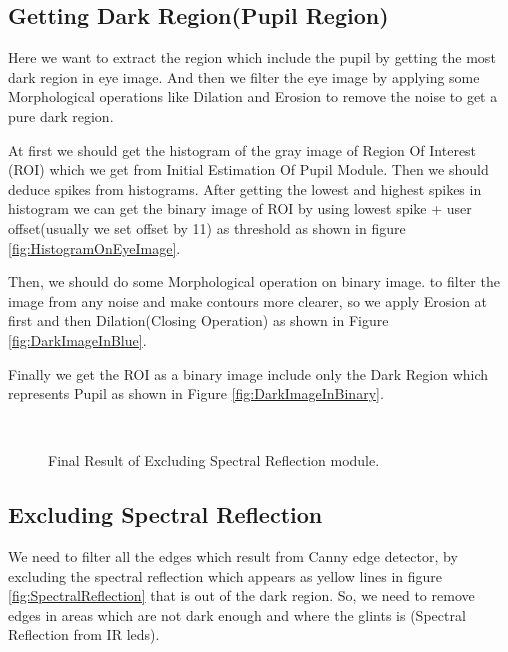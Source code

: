 \documentclass[12pt,fleqn]{book} %
\begin{document}
\subsection{Getting Dark Region(Pupil Region)} 
Here we want to extract the region which include the pupil by getting the most dark region in eye image. And then we filter the eye image by applying some Morphological operations like Dilation and Erosion to remove the noise to get a pure dark region. \bigskip

At first we should get the histogram of the gray image of Region Of Interest (ROI) which we get from Initial Estimation Of Pupil Module. Then we should deduce spikes from histograms. After getting the lowest and highest spikes in histogram we can get the binary image of ROI by using lowest spike +  user offset(usually we set offset by 11) as threshold as shown in figure \ref{fig:HistogramOnEyeImage}. \bigskip

Then, we should do some Morphological operation on binary image. to filter the image from any noise and make contours more clearer, so we apply Erosion at first and then Dilation(Closing Operation) as shown in Figure \ref{fig:DarkImageInBlue}. \bigskip

Finally we get the ROI as a binary image include only the Dark Region which represents Pupil as shown in Figure \ref{fig:DarkImageInBinary}.


\begin{figure}[]
\begin{dBox}
\centering
  \mbox{
   }
   \caption{Final Result of Excluding Spectral Reflection module.
   \label{fig:Edges} }   
\end{dBox}   
\end{figure}

\subsection{Excluding Spectral Reflection} 
	We need to filter all the edges which result from Canny edge detector, by excluding the spectral reflection which appears as yellow lines in figure \ref{fig:SpectralReflection} that is out of the dark region. So, we need to remove edges in areas which are not dark enough and where the glints is (Spectral Reflection from IR leds).\bigskip
		
\end{document}
